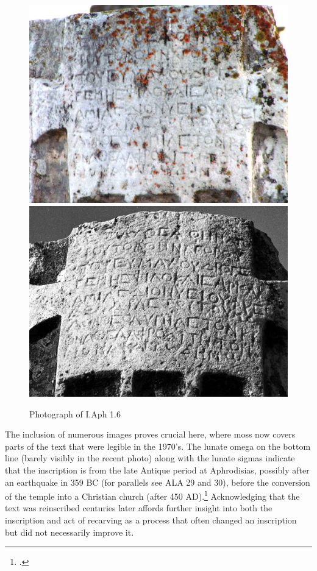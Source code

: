 \documentclass[amsthm,ebook]{saparticle}
\begin{document}
\begin{figure}[!bp]
\centering
 \includegraphics[width=\columnwidth]{PaperproposalforEAGLEfinal-img005.jpg}
  \includegraphics[width=\columnwidth]{PaperproposalforEAGLEfinal-img006.jpg}
\caption{Photograph of I.Aph 1.6}
\label{fig:5}
\end{figure}
 



The inclusion of numerous images proves crucial here, where moss now covers parts of the text that were legible in the
1970’s. The lunate omega on the bottom line (barely visibly in the recent photo) along with the lunate sigmas indicate
that the inscription is from the late Antique period at Aphrodisias, possibly after an earthquake in 359 BC (for
parallels see ALA 29 and 30), before the conversion of the temple into a Christian church (after 450 AD).\footnote{\citet[41-42]{smith1996}.} Acknowledging that the text was reinscribed centuries later affords further insight into both
the inscription and act of recarving as a process that often changed an inscription but did not necessarily improve it.
\end{document}
